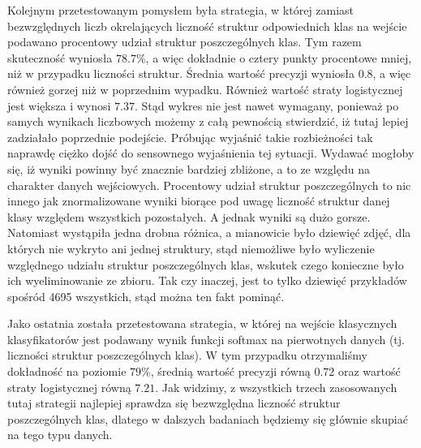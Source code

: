 Kolejnym przetestowanym pomysłem była strategia, w której zamiast bezwzględnych liczb okrelających liczność struktur odpowiednich klas na wejście podawano procentowy udział struktur poszczególnych klas. Tym razem skuteczność wyniosła $78.7\%$, a więc dokładnie o cztery punkty procentowe mniej, niż w przypadku liczności struktur. Średnia wartość precyzji wyniosła $0.8$, a więc również gorzej niż w poprzednim wypadku. Również wartość straty logistycznej jest większa i wynosi $7.37$. Stąd wykres nie jest nawet wymagany, ponieważ po samych wynikach liczbowych możemy z całą pewnością stwierdzić, iż tutaj lepiej zadziałało poprzednie podejście. Próbując wyjaśnić takie rozbieżności tak naprawdę ciężko dojść do sensownego wyjaśnienia tej sytuacji. Wydawać mogłoby się, iż wyniki powinny być znacznie bardziej zbliżone, a to ze względu na charakter danych wejściowych. Procentowy udział struktur poszczególnych to nic innego jak znormalizowane wyniki biorące pod uwagę liczność struktur danej klasy względem wszystkich pozostałych. A jednak wyniki są dużo gorsze. Natomiast wystąpiła jedna drobna różnica, a mianowicie było dziewięć zdjęć, dla których nie wykryto ani jednej struktury, stąd niemożliwe było wyliczenie względnego udziału struktur poszczególnych klas, wskutek czego konieczne było ich wyeliminowanie ze zbioru. Tak czy inaczej, jest to tylko dziewięć przykładów spośród 4695 wszystkich, stąd można ten fakt pominąć. 

Jako ostatnia została przetestowana strategia, w której na wejście klasycznych klasyfikatorów jest podawany wynik funkcji softmax na pierwotnych danych (tj. liczności struktur poszczególnych klas). W tym przypadku otrzymaliśmy dokładność na poziomie $79\%$, średnią wartość precyzji równą $0.72$ oraz wartość straty logistycznej równą $7.21$. Jak widzimy, z wszystkich trzech zasosowanych tutaj strategii najlepiej sprawdza się bezwzględna liczność struktur poszczególnych klas, dlatego w dalszych badaniach będziemy się głównie skupiać na tego typu danych. 

